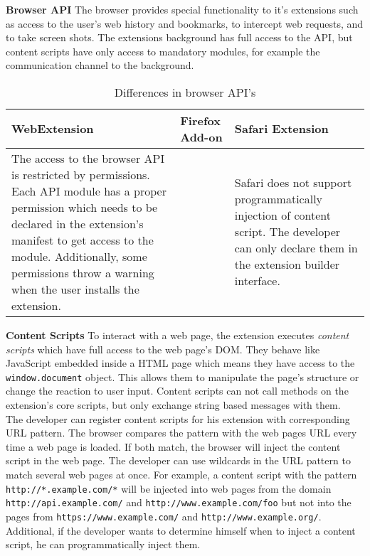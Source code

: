 	\textbf{Browser API} The browser provides special functionality to it's extensions such as access to the user's web history and bookmarks, to intercept web requests, and to take screen shots. The extensions background has full access to the API, but content scripts have only access to mandatory modules, for example the communication channel to the background. 
	
	\begin{table}[h]
		\begin{tabular}{|p{}|p{}|p{}|}\hline
			\textbf{WebExtension} & \textbf{Firefox Add-on} & \textbf{Safari Extension} \\ \hline
			The access to the browser API is restricted by permissions. Each API module has a proper permission which needs to be declared in the extension's manifest to get access to the module. Additionally, some permissions throw a warning when the user installs the extension. & 
			& 
			Safari does not support programmatically injection of content script. The developer can only declare them in the extension builder interface. \\ \hline 
		\end{tabular}
		\caption{Differences in browser API's}
	\end{table}

	\textbf{Content Scripts} To interact with a web page, the extension executes \textit{content scripts} which have full access to the web page's DOM. They behave like JavaScript embedded inside a HTML page which means they have access to the \texttt{window.document} object. This allows them to manipulate the page's structure or change the reaction to user input. Content scripts can not call methods on the extension's core scripts, but only exchange string based messages with them. \\ 
	The developer can register content scripts for his extension with corresponding URL pattern. The browser compares the pattern with the web pages URL every time a web page is loaded. If both match, the browser will inject the content script in the web page. The developer can use wildcards in the URL pattern to match several web pages at once. For example, a content script with the pattern \texttt{http://*.example.com/*} will be injected into web pages from the domain \texttt{http://api.example.com/} and \texttt{http://www.example.com/foo} but not into the pages from \texttt{https://www.example.com/} and \texttt{http://www.example.org/}. Additional, if the developer wants to determine himself when to inject a content script, he can programmatically inject them. \\
	
